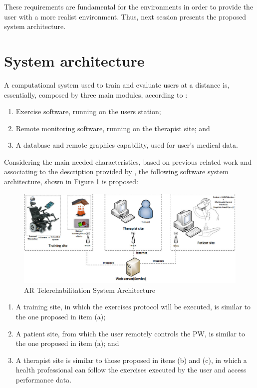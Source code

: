 These requirements are fundamental for the environments in order to provide the user with a more realist environment. Thus, next session presents the proposed system architecture. 

\section{System architecture}

A computational system used to train and evaluate users at a distance is, essentially, composed by three main modules, according to \cite{burdea2004}:

\begin{enumerate}[label=(\alph*)]
\item Exercise software, running on the users station;
\item Remote monitoring software, running on the therapist site; and
\item A database and remote graphics capability, used for user's medical data.
\end{enumerate}

Considering the main needed characteristics, based on previous related work and associating to the description provided by \cite{burdea2004}, the following software system architecture, shown in Figure \ref{fig:architecture} is proposed:

\begin{figure}[!hbt]
\begin{center}
\includegraphics[width=1 \textwidth]{img/cap4/architecture}
\caption{AR Telerehabilitation System Architecture} 
\label{fig:architecture}
\end{center}
\end{figure}


\begin{enumerate}
\item A training site, in which the exercises protocol will be executed, is similar to the one proposed in item (a);
\item A patient site, from which the user remotely controls the PW, is similar to the one proposed in item (a); and
\item A therapist site is similar to those proposed in itens (b) and (c), in which a health professional can follow the exercises executed by the user and access performance data.
\end{enumerate}

